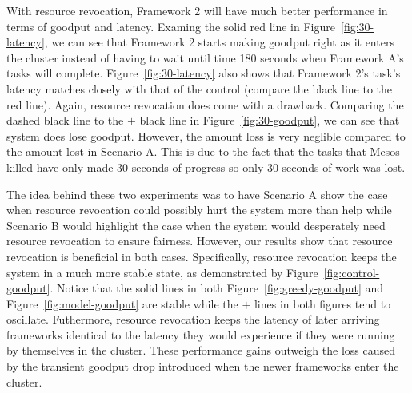 With resource revocation, Framework 2 will have much better performance in terms of goodput and latency.
Examing the solid red line in Figure~\ref{fig:30-latency}, we can see that Framework 2 starts making
goodput right as it enters the cluster instead of having to wait until time 180 seconds when Framework
A's tasks will complete. Figure~\ref{fig:30-latency} also shows that Framework 2's task's latency
matches closely with that of the control (compare the black line to the red line). Again, resource
revocation does come with a drawback. Comparing the dashed black line to the $+$ black line in
Figure~\ref{fig:30-goodput}, we can see that system does lose goodput. However, the amount loss is very
neglible compared to the amount lost in Scenario A. This is due to the fact that the tasks that Mesos
killed have only made 30 seconds of progress so only 30 seconds of work was lost.

The idea behind these two experiments was to have Scenario A show the case when resource revocation
could possibly hurt the system more than help while Scenario B would highlight the case when the system
would desperately need resource revocation to ensure fairness. However, our results show that resource
revocation is beneficial in both cases. Specifically, resource revocation keeps the system in a much
more stable state, as demonstrated by Figure~\ref{fig:control-goodput}. Notice that the solid lines in
both Figure~\ref{fig:greedy-goodput} and Figure~\ref{fig:model-goodput} are stable while the $+$ lines
in both figures tend to oscillate. Futhermore, resource revocation keeps the latency of later arriving 
frameworks identical to the latency they would experience if they were running by themselves in the 
cluster. These performance gains outweigh the loss caused by the transient goodput drop introduced when
the newer frameworks enter the cluster.
